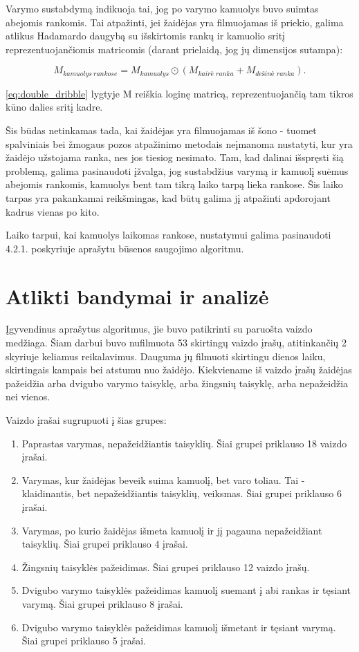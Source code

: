 \documentclass{VUMIFPSbakalaurinis}
\begin{document}
Varymo sustabdymą indikuoja tai, jog po varymo kamuolys buvo suimtas abejomis rankomis. Tai atpažinti, jei žaidėjas yra filmuojamas iš priekio, galima atlikus Hadamardo daugybą su išskirtomis rankų ir kamuolio sritį reprezentuojančiomis matricomis (darant prielaidą, jog jų dimensijos sutampa):

\begin{equation}\label{eq:double_dribble}
	M_{kamuolys\ rankose} = M_{kamuolys} \odot (M_{\textit{kairė\ ranka}} + M_{\textit{dešinė\ ranka}}).
\end{equation}

\ref{eq:double_dribble} lygtyje M reiškia loginę matricą, reprezentuojančią tam tikros kūno dalies sritį kadre. 

Šis būdas netinkamas tada, kai žaidėjas yra filmuojamas iš šono - tuomet spalviniais bei žmogaus pozos atpažinimo metodais neįmanoma nustatyti, kur yra žaidėjo užstojama ranka, nes jos tiesiog nesimato. Tam, kad dalinai išspręsti šią problemą, galima pasinaudoti įžvalga, jog sustabdžius varymą ir kamuolį suėmus abejomis rankomis, kamuolys bent tam tikrą laiko tarpą lieka rankose. Šis laiko tarpas yra pakankamai reikšmingas, kad būtų galima jį atpažinti apdorojant kadrus vienas po kito. 

Laiko tarpui, kai kamuolys laikomas rankose, nustatymui galima pasinaudoti 4.2.1. poskyriuje aprašytu būsenos saugojimo algoritmu. 

\section{Atlikti bandymai ir analizė}

Įgyvendinus aprašytus algoritmus, jie buvo patikrinti su paruošta vaizdo medžiaga. Šiam darbui buvo nufilmuota 53 skirtingų vaizdo įrašų, atitinkančių 2 skyriuje keliamus reikalavimus. Dauguma jų filmuoti skirtingu dienos laiku, skirtingais kampais bei atstumu nuo žaidėjo. Kiekviename iš vaizdo įrašų žaidėjas pažeidžia arba dvigubo varymo taisyklę, arba žingsnių taisyklę, arba nepažeidžia nei vienos.  

Vaizdo įrašai sugrupuoti į šias grupes: 

\begin{enumerate}
	\item Paprastas varymas, nepažeidžiantis taisyklių. Šiai grupei priklauso 18 vaizdo įrašai.
	\item Varymas, kur žaidėjas beveik suima kamuolį, bet varo toliau. Tai - klaidinantis, bet nepažeidžiantis taisyklių, veiksmas. Šiai grupei priklauso 6 įrašai. 
	\item Varymas, po kurio žaidėjas išmeta kamuolį ir jį pagauna nepažeidžiant taisyklių. Šiai grupei priklauso 4 įrašai. 
	\item Žingsnių taisyklės pažeidimas. Šiai grupei priklauso 12 vaizdo įrašų.
	\item Dvigubo varymo taisyklės pažeidimas kamuolį suemant į abi rankas ir tęsiant varymą. Šiai grupei priklauso 8 įrašai.
	\item Dvigubo varymo taisyklės pažeidimas kamuolį išmetant ir tęsiant varymą. Šiai grupei priklauso 5 įrašai. 
\end{enumerate}
\end{document}
